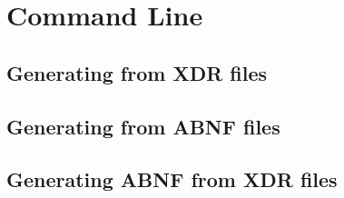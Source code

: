 \section{Command Line}
\subsection{Generating from XDR files}
\subsection{Generating from ABNF files}
\subsection{Generating ABNF from XDR files}

